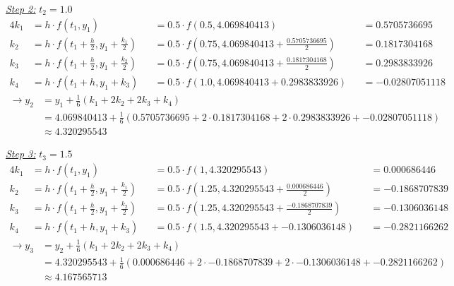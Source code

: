 \documentclass[a4paper]{article}
\numberwithin{equation}{section}
\begin{document}
\underline{\textit{Step 2:}} \(t_2=1.0\)
\begin{alignat*}{4}
  k_1 & = h\cdot f(t_1, y_1)                                            &  & = 0.5\cdot f(0.5,4.069840413)                    &  & = 0.5705736695                \\
  k_2 & = h\cdot f \left(t_1 + \frac{h}{2}, y_1 + \frac{k_1}{2}\right) &  & = 0.5\cdot f(0.75, 4.069840413+\frac{0.5705736695 }{2})                  &  & = 0.1817304168               \\
  k_3 & = h\cdot f \left(t_1 + \frac{h}{2}, y_1 + \frac{k_2}{2}\right) &  & = 0.5\cdot f(0.75, 4.069840413+\frac{0.1817304168}{2})               &  & = 0.2983833926 \\
  k_4 & = h\cdot f(t_1 + h, y_1 + k_3)                                 &  & = 0.5\cdot f(1.0, 4.069840413+0.2983833926) &  & = -0.02807051118 
\end{alignat*}
\begin{align*}
     \rightarrow y_2 & = y_1 + \frac{1}{6}(k_1 + 2k_2 + 2k_3 + k_4)                                                             \\
       &= 4.069840413 + \frac{1}{6} \left(0.5705736695 + 2 \cdot 0.1817304168  + 2 \cdot  0.2983833926 + -0.02807051118\right) \\               
      & \approx 4.320295543
\end{align*}

\underline{\textit{Step 3:}} \(t_3=1.5\)
\begin{alignat*}{4}
  k_1 & = h\cdot f(t_1, y_1)                                            &  & = 0.5\cdot f(1,4.320295543)                    &  & = 0.000686446               \\
  k_2 & = h\cdot f \left(t_1 + \frac{h}{2}, y_1 + \frac{k_1}{2}\right) &  & = 0.5\cdot f(1.25, 4.320295543+\frac{0.000686446 }{2})                  &  & = -0.1868707839               \\
  k_3 & = h\cdot f \left(t_1 + \frac{h}{2}, y_1 + \frac{k_2}{2}\right) &  & = 0.5\cdot f(1.25, 4.320295543+\frac{-0.1868707839}{2})               &  & = -0.1306036148 \\
  k_4 & = h\cdot f(t_1 + h, y_1 + k_3)                                 &  & = 0.5\cdot f(1.5, 4.320295543+-0.1306036148) &  & = -0.2821166262
\end{alignat*}
\begin{align*}
     \rightarrow y_3 & = y_2 + \frac{1}{6}(k_1 + 2k_2 + 2k_3 + k_4)                                                             \\
       &= 4.320295543 + \frac{1}{6} \left(0.000686446 + 2 \cdot -0.1868707839   + 2 \cdot  -0.1306036148 + -0.2821166262\right) \\               
      & \approx 4.167565713
\end{align*}
\end{document}

